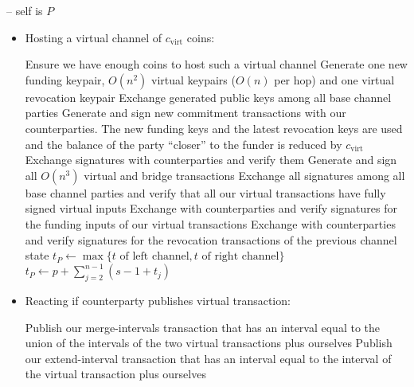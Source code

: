 \begin{center}
\begin{processbox}{\pchan -- self is $P$}
\begin{itemize}
      \item Hosting a virtual channel of $c_{\mathrm{virt}}$ coins:
      \begin{algorithmic}[0]
        \State Ensure we have enough coins to host such a virtual channel
        \State Generate one new funding keypair, $O(n^2)$ virtual keypairs
        ($O(n)$ per hop) and one virtual revocation keypair 
        \State Exchange generated public keys among all base channel parties
        \State Generate and sign new commitment transactions with our
        counterparties. The new funding keys and the latest revocation keys are
        used and the balance of the party ``closer'' to the funder is reduced by
        $c_{\mathrm{virt}}$ 
        \State Exchange signatures with counterparties and verify them
        \State Generate and sign all $O(n^3)$ virtual and bridge transactions
        \State Exchange all signatures among all base channel parties and verify
        that all our virtual transactions have fully signed virtual inputs
        \State Exchange with counterparties and verify signatures for the
        funding inputs of our virtual transactions 
        \State Exchange with counterparties and verify signatures for the
        revocation transactions of the previous channel state
          \State $t_P \gets \max\{t \text{ of left channel}, t \text{ of right
          channel}\}$
        \Else \: 
          \State $t_P \gets p + \sum\limits_{j = 2}^{n-1}(s - 1 + t_j)$
        \EndIf
      \end{algorithmic}

      \item Reacting if counterparty publishes virtual transaction:
      \begin{algorithmic}[0]
          \State Publish our merge-intervals transaction that has an interval
          equal to the union of the intervals of the two virtual transactions
          plus ourselves
        \Else \: 
          \State Publish our extend-interval transaction that has an interval
          equal to the interval of the virtual transaction plus ourselves
        \EndIf
      \end{algorithmic}


\end{itemize}
\end{processbox}
\end{center}
